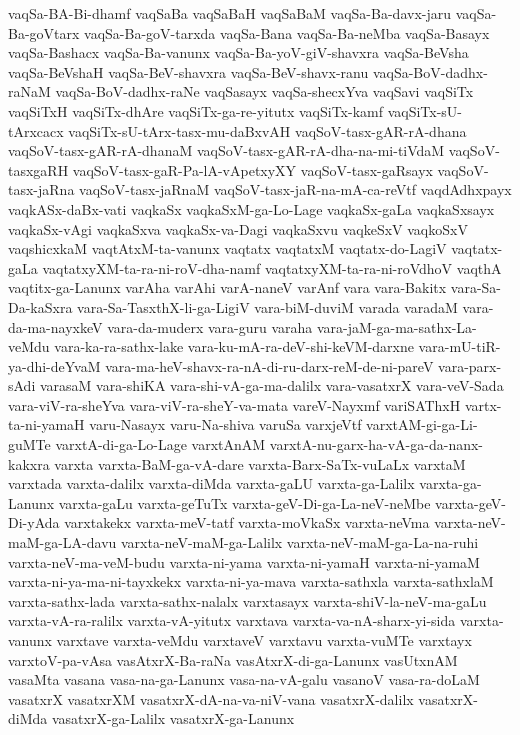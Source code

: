 {vaqSa-BA-Bi-dhamf
vaqSaBa
vaqSaBaH
vaqSaBaM
vaqSa-Ba-davx-jaru
vaqSa-Ba-goVtarx
vaqSa-Ba-goV-tarxda
vaqSa-Bana
vaqSa-Ba-neMba
vaqSa-Basayx
vaqSa-Bashacx
vaqSa-Ba-vanunx
vaqSa-Ba-yoV-giV-shavxra
vaqSa-BeVsha
vaqSa-BeVshaH
vaqSa-BeV-shavxra
vaqSa-BeV-shavx-ranu
vaqSa-BoV-dadhx-raNaM
vaqSa-BoV-dadhx-raNe
vaqSasayx
vaqSa-shecxYva
vaqSavi
vaqSiTx
vaqSiTxH
vaqSiTx-dhAre
vaqSiTx-ga-re-yitutx
vaqSiTx-kamf
vaqSiTx-sU-tArxcacx
vaqSiTx-sU-tArx-tasx-mu-daBxvAH
vaqSoV-tasx-gAR-rA-dhana
vaqSoV-tasx-gAR-rA-dhanaM
vaqSoV-tasx-gAR-rA-dha-na-mi-tiVdaM
vaqSoV-tasxgaRH
vaqSoV-tasx-gaR-Pa-lA-vApetxyXY
vaqSoV-tasx-gaRsayx
vaqSoV-tasx-jaRna
vaqSoV-tasx-jaRnaM
vaqSoV-tasx-jaR-na-mA-ca-reVtf
vaqdAdhxpayx
vaqkASx-daBx-vati
vaqkaSx
vaqkaSxM-ga-Lo-Lage
vaqkaSx-gaLa
vaqkaSxsayx
vaqkaSx-vAgi
vaqkaSxva
vaqkaSx-va-Dagi
vaqkaSxvu
vaqkeSxV
vaqkoSxV
vaqshicxkaM
vaqtAtxM-ta-vanunx
vaqtatx
vaqtatxM
vaqtatx-do-LagiV
vaqtatx-gaLa
vaqtatxyXM-ta-ra-ni-roV-dha-namf
vaqtatxyXM-ta-ra-ni-roVdhoV
vaqthA
vaqtitx-ga-Lanunx
varAha
varAhi
varA-naneV
varAnf
vara
vara-Bakitx
vara-Sa-Da-kaSxra
vara-Sa-TasxthX-li-ga-LigiV
vara-biM-duviM
varada
varadaM
vara-da-ma-nayxkeV
vara-da-muderx
vara-guru
varaha
vara-jaM-ga-ma-sathx-La-veMdu
vara-ka-ra-sathx-lake
vara-ku-mA-ra-deV-shi-keVM-darxne
vara-mU-tiR-ya-dhi-deYvaM
vara-ma-heV-shavx-ra-nA-di-ru-darx-reM-de-ni-pareV
vara-parx-sAdi
varasaM
vara-shiKA
vara-shi-vA-ga-ma-dalilx
vara-vasatxrX
vara-veV-Sada
vara-viV-ra-sheYva
vara-viV-ra-sheY-va-mata
vareV-Nayxmf
variSAThxH
vartx-ta-ni-yamaH
varu-Nasayx
varu-Na-shiva
varuSa
varxjeVtf
varxtAM-gi-ga-Li-guMTe
varxtA-di-ga-Lo-Lage
varxtAnAM
varxtA-nu-garx-ha-vA-ga-da-nanx-kakxra
varxta
varxta-BaM-ga-vA-dare
varxta-Barx-SaTx-vuLaLx
varxtaM
varxtada
varxta-dalilx
varxta-diMda
varxta-gaLU
varxta-ga-Lalilx
varxta-ga-Lanunx
varxta-gaLu
varxta-geTuTx
varxta-geV-Di-ga-La-neV-neMbe
varxta-geV-Di-yAda
varxtakekx
varxta-meV-tatf
varxta-moVkaSx
varxta-neVma
varxta-neV-maM-ga-LA-davu
varxta-neV-maM-ga-Lalilx
varxta-neV-maM-ga-La-na-ruhi
varxta-neV-ma-veM-budu
varxta-ni-yama
varxta-ni-yamaH
varxta-ni-yamaM
varxta-ni-ya-ma-ni-tayxkekx
varxta-ni-ya-mava
varxta-sathxla
varxta-sathxlaM
varxta-sathx-lada
varxta-sathx-nalalx
varxtasayx
varxta-shiV-la-neV-ma-gaLu
varxta-vA-ra-ralilx
varxta-vA-yitutx
varxtava
varxta-va-nA-sharx-yi-sida
varxta-vanunx
varxtave
varxta-veMdu
varxtaveV
varxtavu
varxta-vuMTe
varxtayx
varxtoV-pa-vAsa
vasAtxrX-Ba-raNa
vasAtxrX-di-ga-Lanunx
vasUtxnAM
vasaMta
vasana
vasa-na-ga-Lanunx
vasa-na-vA-galu
vasanoV
vasa-ra-doLaM
vasatxrX
vasatxrXM
vasatxrX-dA-na-va-niV-vana
vasatxrX-dalilx
vasatxrX-diMda
vasatxrX-ga-Lalilx
vasatxrX-ga-Lanunx
}
